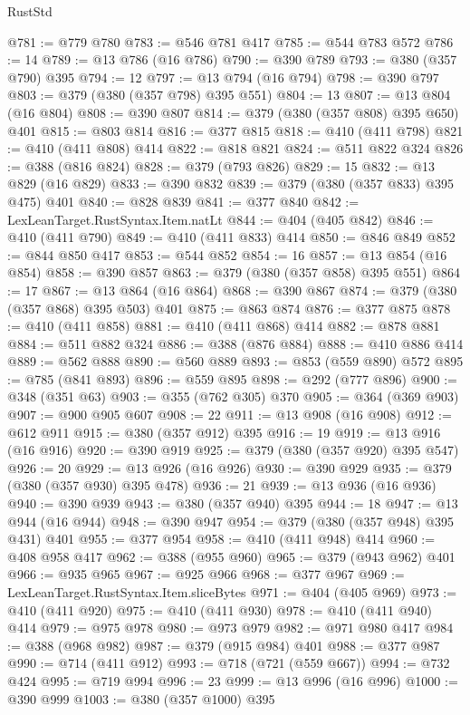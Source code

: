\begin{lexlean}{RustStd}
\begin{coremodule}
{\begin{coremodule}
{{{{{{{{@781 := @779 @780
@783 := @546 @781 @417
@785 := @544 @783 @572
@786 := 14
@789 := @13 @786 (@16 @786)
@790 := @390 @789
@793 := @380 (@357 @790) @395
@794 := 12
@797 := @13 @794 (@16 @794)
@798 := @390 @797
@803 := @379 (@380 (@357 @798) @395 @551)
@804 := 13
@807 := @13 @804 (@16 @804)
@808 := @390 @807
@814 := @379 (@380 (@357 @808) @395 @650) @401
@815 := @803 @814
@816 := @377 @815
@818 := @410 (@411 @798)
@821 := @410 (@411 @808) @414
@822 := @818 @821
@824 := @511 @822 @324
@826 := @388 (@816 @824)
@828 := @379 (@793 @826)
@829 := 15
@832 := @13 @829 (@16 @829)
@833 := @390 @832
@839 := @379 (@380 (@357 @833) @395 @475) @401
@840 := @828 @839
@841 := @377 @840
@842 := LexLeanTarget.RustSyntax.Item.natLt
@844 := @404 (@405 @842)
@846 := @410 (@411 @790)
@849 := @410 (@411 @833) @414
@850 := @846 @849
@852 := @844 @850 @417
@853 := @544 @852
@854 := 16
@857 := @13 @854 (@16 @854)
@858 := @390 @857
@863 := @379 (@380 (@357 @858) @395 @551)
@864 := 17
@867 := @13 @864 (@16 @864)
@868 := @390 @867
@874 := @379 (@380 (@357 @868) @395 @503) @401
@875 := @863 @874
@876 := @377 @875
@878 := @410 (@411 @858)
@881 := @410 (@411 @868) @414
@882 := @878 @881
@884 := @511 @882 @324
@886 := @388 (@876 @884)
@888 := @410 @886 @414
@889 := @562 @888
@890 := @560 @889
@893 := @853 (@559 @890) @572
@895 := @785 (@841 @893)
@896 := @559 @895
@898 := @292 (@777 @896)
@900 := @348 (@351 @63)
@903 := @355 (@762 @305) @370
@905 := @364 (@369 @903)
@907 := @900 @905 @607
@908 := 22
@911 := @13 @908 (@16 @908)
@912 := @612 @911
@915 := @380 (@357 @912) @395
@916 := 19
@919 := @13 @916 (@16 @916)
@920 := @390 @919
@925 := @379 (@380 (@357 @920) @395 @547)
@926 := 20
@929 := @13 @926 (@16 @926)
@930 := @390 @929
@935 := @379 (@380 (@357 @930) @395 @478)
@936 := 21
@939 := @13 @936 (@16 @936)
@940 := @390 @939
@943 := @380 (@357 @940) @395
@944 := 18
@947 := @13 @944 (@16 @944)
@948 := @390 @947
@954 := @379 (@380 (@357 @948) @395 @431) @401
@955 := @377 @954
@958 := @410 (@411 @948) @414
@960 := @408 @958 @417
@962 := @388 (@955 @960)
@965 := @379 (@943 @962) @401
@966 := @935 @965
@967 := @925 @966
@968 := @377 @967
@969 := LexLeanTarget.RustSyntax.Item.sliceBytes
@971 := @404 (@405 @969)
@973 := @410 (@411 @920)
@975 := @410 (@411 @930)
@978 := @410 (@411 @940) @414
@979 := @975 @978
@980 := @973 @979
@982 := @971 @980 @417
@984 := @388 (@968 @982)
@987 := @379 (@915 @984) @401
@988 := @377 @987
@990 := @714 (@411 @912)
@993 := @718 (@721 (@559 @667))
@994 := @732 @424
@995 := @719 @994
@996 := 23
@999 := @13 @996 (@16 @996)
@1000 := @390 @999
@1003 := @380 (@357 @1000) @395
}}}}}}}}
\end{coremodule}}
\end{coremodule}
\end{lexlean}
